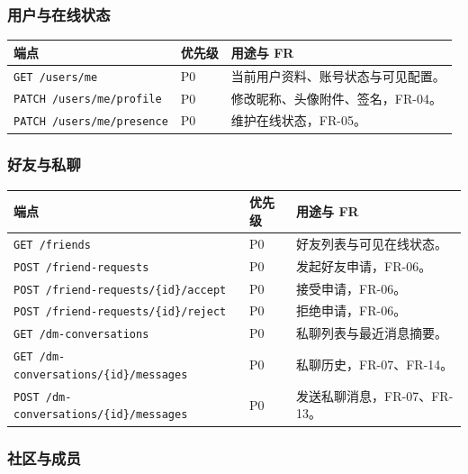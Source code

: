 \subsubsection{用户与在线状态}

\noindent\begin{tabularx}{\textwidth}{L{6.4cm}L{2.2cm}Y}
  \toprule
  端点 & 优先级 & 用途与 FR \\
  \midrule
  \texttt{GET /users/me} & P0 & 当前用户资料、账号状态与可见配置。 \\
  \texttt{PATCH /users/me/profile} & P0 & 修改昵称、头像附件、签名，FR-04。 \\
  \texttt{PATCH /users/me/presence} & P0 & 维护在线状态，FR-05。 \\
  \bottomrule
\end{tabularx}

\subsubsection{好友与私聊}

\noindent\begin{tabularx}{\textwidth}{L{6.4cm}L{2.2cm}Y}
  \toprule
  端点 & 优先级 & 用途与 FR \\
  \midrule
  \texttt{GET /friends} & P0 & 好友列表与可见在线状态。 \\
  \texttt{POST /friend-requests} & P0 & 发起好友申请，FR-06。 \\
  \texttt{POST /friend-requests/\{id\}/accept} & P0 & 接受申请，FR-06。 \\
  \texttt{POST /friend-requests/\{id\}/reject} & P0 & 拒绝申请，FR-06。 \\
  \texttt{GET /dm-conversations} & P0 & 私聊列表与最近消息摘要。 \\
  \texttt{GET /dm-conversations/\{id\}/messages} & P0 & 私聊历史，FR-07、FR-14。 \\
  \texttt{POST /dm-conversations/\{id\}/messages} & P0 & 发送私聊消息，FR-07、FR-13。 \\
  \bottomrule
\end{tabularx}

\subsubsection{社区与成员}

